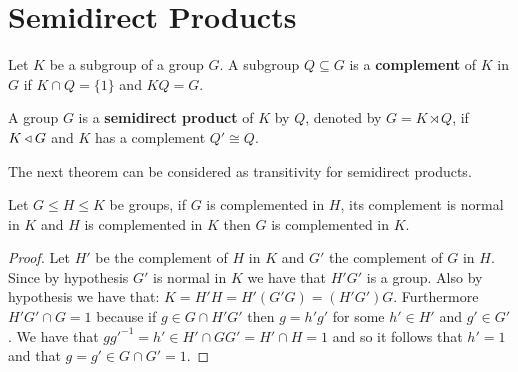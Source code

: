\section{Semidirect Products}

\begin{definition}
    Let $K$ be a subgroup of a group $G$. A subgroup $Q \subseteq G$ is a \textbf{complement} of $K$ in $G$ if $K \cap Q = \{1\}$ and $KQ = G$.
\end{definition}

\begin{definition}
    A group $G$ is a \textbf{semidirect product} of $K$ by $Q$, denoted by $G = K \rtimes Q$, if $K \triangleleft G$ and $K$ has a complement $Q' \cong Q$.

\end{definition}

The next theorem can be considered as transitivity for semidirect products.

\begin{theorem}
\label{smdptrans}
Let $G \le H \le K$ be groups, if $G$ is complemented in $H$, its complement is normal in $K$ and $H$ is complemented in $K$ then $G$ is complemented in $K$.
\end{theorem}

\begin{proof}
    Let $H'$ be the complement of $H$ in $K$ and $G'$ the complement of $G$ in $H$. Since by hypothesis $G'$ is normal in $K$ we have that $H'G'$ is a group. Also by hypothesis we have that:
    $K = H'H =H'(G'G) = (H'G')G$.
    Furthermore $H'G' \cap G = 1$ because if $g \in G \cap H'G'$ then $g = h'g'$ for some $h' \in H'$ and $g' \in G'$. We have that $gg'^{-1} = h' \in H' \cap GG' = H' \cap H = 1$ and so it follows that $h' = 1$ and that $g = g' \in G \cap G' = 1$.
\end{proof}